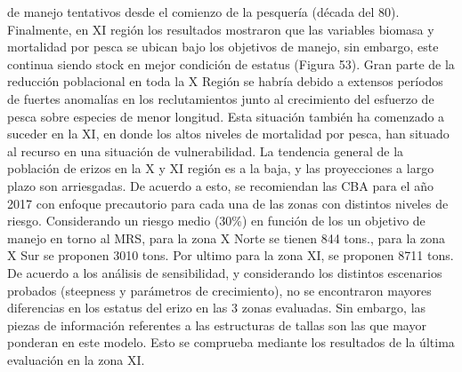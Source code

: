 \documentclass[
]{article}
\begin{document}
de manejo tentativos desde el comienzo de la pesquería (década del 80).
Finalmente, en XI región los resultados mostraron que las variables
biomasa y mortalidad por pesca se ubican bajo los objetivos de manejo,
sin embargo, este continua siendo stock en mejor condición de estatus
(Figura 53). Gran parte de la reducción poblacional en toda la X Región
se habría debido a extensos períodos de fuertes anomalías en los
reclutamientos junto al crecimiento del esfuerzo de pesca sobre especies
de menor longitud. Esta situación también ha comenzado a suceder en la
XI, en donde los altos niveles de mortalidad por pesca, han situado al
recurso en una situación de vulnerabilidad. La tendencia general de la
población de erizos en la X y XI región es a la baja, y las proyecciones
a largo plazo son arriesgadas. De acuerdo a esto, se recomiendan las CBA
para el año 2017 con enfoque precautorio para cada una de las zonas con
distintos niveles de riesgo. Considerando un riesgo medio (30\%) en
función de los un objetivo de manejo en torno al MRS, para la zona X
Norte se tienen 844 tons., para la zona X Sur se proponen 3010 tons. Por
ultimo para la zona XI, se proponen 8711 tons. De acuerdo a los análisis
de sensibilidad, y considerando los distintos escenarios probados
(steepness y parámetros de crecimiento), no se encontraron mayores
diferencias en los estatus del erizo en las 3 zonas evaluadas. Sin
embargo, las piezas de información referentes a las estructuras de
tallas son las que mayor ponderan en este modelo. Esto se comprueba
mediante los resultados de la última evaluación en la zona XI.
\end{document}
